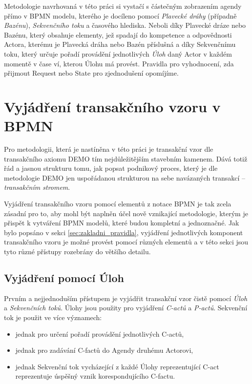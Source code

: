 \documentclass[]{article}
\begin{document}
Metodologie navrhovaná v této práci si vystačí s částečným zobrazením agendy přímo v BPMN modelu, kterého je docíleno pomocí \textit{Plavecké dráhy} (případně \textit{Bazénu}), \textit{Sekvenčního toku} a časového hlediska. Neboli díky Plavecké dráze nebo Bazénu, který obsahuje elementy, jež spadají do kompetence a odpovědnosti Actora, kterému je Plavecká dráha nebo Bazén příslušná a díky Sekvenčnímu toku, který určuje pořadí provádění jednotlivých \textit{Úloh} daný Actor v každém momentě v čase ví, kterou Úlohu má provést. Pravidla pro vyhodnocení, zda přijmout Request nebo State pro zjednodušení opomíjíme.

\section{Vyjádření transakčního vzoru v BPMN}
Pro metodologii, která je nastíněna v této práci je transakční vzor dle transakčního axiomu DEMO tím nejdůležitějším stavebním kamenem. Dává totiž řád a jasnou strukturu tomu, jak popsat podnikový proces, který je dle metodologie DEMO jen uspořádanou strukturou na sebe navázaných transakcí – \textit{transakčním stromem}.

Vyjádření transakčního vzoru pomocí elementů z notace BPMN je tak zcela zásadní pro to, aby mohl být naplněn účel nově vznikající metodologie, kterým je přispět k vytváření BPMN modelů, které budou kompletní a jednoznačné. Jak bylo popsáno v sekci \ref{sec:zakladni_pravidla}, vyjádření jednotlivých komponent transakčního vzoru je možné provést pomocí různých elementů a v této sekci jsou tyto různé přístupy rozebrány do většího detailu. 

\subsection{Vyjádření pomocí Úloh} \label{sec:vyjadreni_ulohy}
Prvním a nejjednoduším přístupem je vyjádřit transakční vzor čistě pomocí \textit{Úloh} a \textit{Sekvenčních toků}. Úlohy jsou použity pro vyjádření \textit{C-actů} a \textit{P-actů}. Sekvenční tok je použit ve více významech:

\begin{itemize}
\item jednak pro určení pořadí provádění jednotlivých C-actů,
\item jednak pro zadávání C-factů do Agendy druhému Actorovi,
\item jednak Sekvenční tok vycházející z každé Úlohy reprezentující C-act reprezentuje úspěšný vznik korespondujícího C-factu.
\end{itemize}
\end{document}
